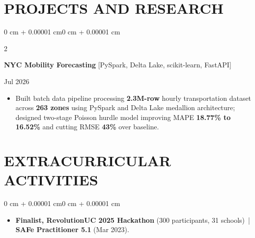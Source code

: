 \documentclass[10pt, letterpaper]{article}
\newenvironment{highlights}{
    \begin{itemize}[
        topsep=0.10 cm,
        parsep=0.06 cm,
        partopsep=0pt,
        itemsep=0.06 cm,
        leftmargin=12pt
    ]
}{
    \end{itemize}
}
\newenvironment{onecolentry}{
    \begin{adjustwidth}{0 cm + 0.00001 cm}{0 cm + 0.00001 cm}
}{
    \end{adjustwidth}
}
\newenvironment{twocolentry}[2][]{
    \onecolentry
    \def\secondColumn{#2}
    \setcolumnwidth{\fill, 4.5 cm}
    \begin{paracol}{2}
}{
    \switchcolumn \raggedleft \secondColumn
    \end{paracol}
    \endonecolentry
}
\begin{document}
\section{PROJECTS AND RESEARCH}
\begin{twocolentry}{Jul 2026}
\textbf{NYC Mobility Forecasting} [PySpark, Delta Lake, scikit-learn, FastAPI]
\end{twocolentry}
\begin{highlights}
  \item Built batch data pipeline processing \textbf{2.3M-row} hourly transportation dataset across \textbf{263 zones} using PySpark and Delta Lake medallion architecture; designed two-stage Poisson hurdle model improving MAPE \textbf{18.77\% to 16.52\%} and cutting RMSE \textbf{43\%} over baseline.
\end{highlights}

\section{EXTRACURRICULAR ACTIVITIES}
\begin{onecolentry}
\begin{highlights}
  \item \textbf{Finalist, RevolutionUC 2025 Hackathon} (300 participants, 31 schools) \,|\, \textbf{SAFe Practitioner 5.1} (Mar 2023).
\end{highlights}
\end{onecolentry}
\end{document}
